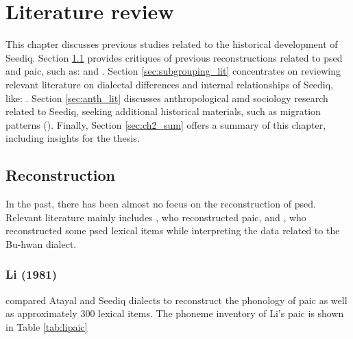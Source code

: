 \chapter{Literature review}\label{ch2}

This chapter discusses previous studies related to the historical development of Seediq. Section \ref{sec:reconstruction_lit} provides critiques of previous reconstructions related to \acl{psed} and \acl{paic}, such as: \textcite{li1981paic} and \textcite{ochiai2016buhwan}. Section \ref{sec:subgrouping_lit} concentrates on reviewing relevant literature on dialectal differences and internal relationships of Seediq, like: \textcites{ogawaandasai1935}{Chengetal2017Truku}{Chengetal2019Tgdaya}{Sung2018Sedgrammar}. Section \ref{sec:anth_lit} discusses anthropological amd sociology research related to Seediq, seeking additional historical materials, such as migration patterns (\cite{liao1977Sedtheruy,liao1978Sedtheruy,yap2023}). Finally, Section \ref{sec:ch2_sum} offers a summary of this chapter, including insights for the thesis.

\section{Reconstruction} \label{sec:reconstruction_lit}

In the past, there has been almost no focus on the reconstruction of \acl{psed}. Relevant literature mainly includes \textcite{li1981paic}, who reconstructed \acl{paic}, and \textcite{ochiai2016buhwan}, who reconstructed some \acl{psed} lexical items while interpreting the \textcite{bullock1874formosan} data related to the Bu-hwan dialect.

\subsection{Li (1981)}

\textcite{li1981paic} compared Atayal and Seediq dialects to reconstruct the phonology of \acl{paic} as well as approximately 300 lexical items. The phoneme inventory of Li's \acl{paic} is shown in Table \ref{tab:lipaic}


